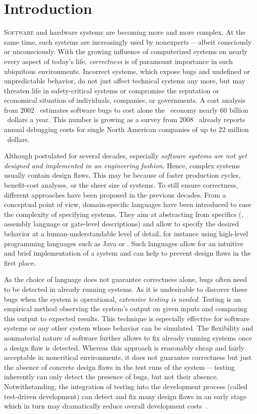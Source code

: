 \chapter{Introduction}

\lettrine[findent=.1em,lines=2,nindent=0em]{S}{oftware} and hardware systems are becoming more and more complex. At the same time, such systems are increasingly used by nonexperts\,---\,albeit consciously or unconsciously. With the growing influence of computerized systems on nearly every aspect of today's life, \emph{correctness} is of paramount importance in such ubiquitous environments. Incorrect systems, which expose bugs and undefined or unpredictable behavior, do not just affect technical systems any more, but may threaten life in safety-critical systems or compromise the reputation or economical situation of individuals, companies, or governments. A cost analysis from 2002~\cite{nist_2002} estimates software bugs to cost alone the ~economy nearly 60 billion ~dollars a year. This number is growing as a survey from 2008~\cite{idc_2008} already reports annual debugging costs for single North American companies of up to 22 million ~dollars.

Although postulated for several decades, especially \emph{software systems are not yet designed and implemented in an engineering fashion}. Hence, complex systems usually contain design flaws. This may be because of faster production cycles, benefit-cost analyses, or the sheer size of systems. To still ensure correctness, different approaches have been proposed in the previous decades. From a conceptual point of view, domain-specific languages have been introduced to ease the complexity of specifying systems. They aim at abstracting from specifics (\eg, assembly language or gate-level descriptions) and allow to specify the desired behavior at a human-understandable level of detail, for instance using high-level programming languages such as Java or . Such languages allow for an intuitive and brief implementation of a system and can help to prevent design flaws in the first place.

As the choice of language does not guarantee correctness alone, bugs often need to be detected in already running systems. As it is undesirable to discover these bugs when the system is operational, \emph{extensive testing is needed}. Testing is an empirical method observing the system's output on given inputs and comparing this output to expected results. This technique is especially effective for software systems or any other system whose behavior can be simulated. The flexibility and nonmaterial nature of software further allows to fix already running systems once a design flaw is detected. Whereas this approach is reasonably cheap and fairly acceptable in noncritical environments, it does not guarantee correctness but just the absence of concrete design flaws in the test runs of the system\,---\,testing inherently can only detect the presence of bugs, but not their absence. Notwithstanding, the integration of testing into the development process (called test-driven development) can detect and fix many design flaws in an early stage which in turn may dramatically reduce overall development costs~\cite{Moody_2005_dke}.

